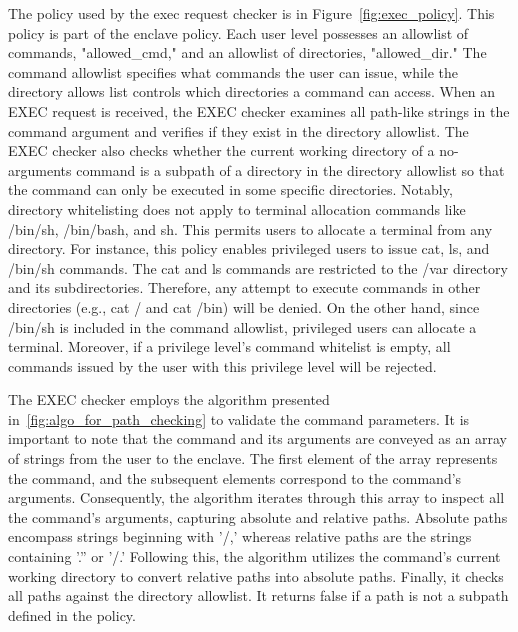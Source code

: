 The policy used by the exec request checker is in Figure~\ref{fig:exec_policy}. This policy is part of the enclave policy. Each user level possesses an allowlist of commands, "allowed\_cmd," and an allowlist of directories, "allowed\_dir." The command allowlist specifies what commands the user can issue, while the 
directory allows list controls which directories a command can access. When an EXEC request is received, the EXEC checker examines all path-like strings in the command argument and verifies if they exist in the directory allowlist. The EXEC checker also checks whether the current working directory of 
a no-arguments command is a subpath of a directory in the directory allowlist so that the command can only be executed in some specific directories. Notably,  directory whitelisting does not apply to terminal allocation commands like /bin/sh, /bin/bash, and sh. This permits users to allocate a terminal 
from any directory. For instance, this policy enables privileged users to issue cat, ls, and /bin/sh commands. The cat and ls commands are restricted to the /var directory and its subdirectories. Therefore, any attempt to execute commands in other directories (e.g., cat / and cat /bin) will be denied. 
On the other hand, since /bin/sh is included in the command allowlist, privileged users can allocate a terminal. Moreover, if a privilege level's command whitelist is empty, all commands issued by the user with this privilege level will be rejected.



The EXEC checker employs the algorithm presented in~\ref{fig:algo_for_path_checking} to validate the command parameters. It is important to note that the command and its arguments are conveyed as an array of strings from the user to the enclave. The first element of the array represents the command, and the subsequent elements 
correspond to the command's arguments. Consequently, the algorithm iterates through this array to inspect all the command's arguments, capturing absolute and relative paths. Absolute paths encompass strings beginning with '/,' whereas relative paths are the strings containing '.'' or '/.' Following 
this, the algorithm utilizes the command's current working directory to convert relative paths into absolute paths. Finally, it checks all paths against the directory allowlist. It returns false if a path is not a subpath defined in the policy.


